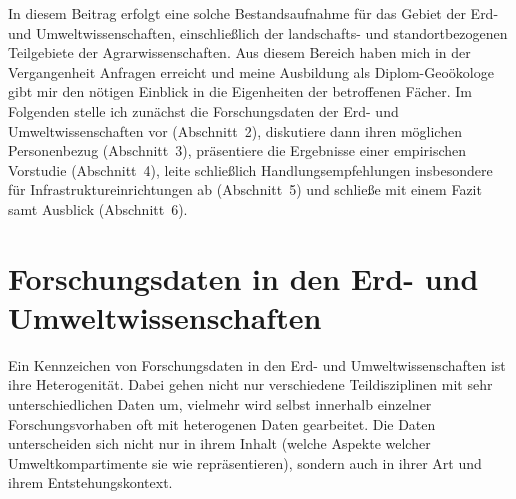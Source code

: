 \documentclass[a4paper,
fontsize=11pt,
oneside,
numbers=noperiodatend,
parskip=half-,
bibliography=totoc,
final
]{scrartcl}
\begin{document}
In diesem Beitrag erfolgt eine solche Bestandsaufnahme für das Gebiet
der Erd- und Umweltwissenschaften, einschließlich der landschafts- und
standortbezogenen Teilgebiete der Agrarwissenschaften. Aus diesem
Bereich haben mich in der Vergangenheit Anfragen erreicht und meine
Ausbildung als Diplom-Geoökologe gibt mir den nötigen Einblick in die
Eigenheiten der betroffenen Fächer. Im Folgenden stelle ich zunächst die
Forschungsdaten der Erd- und Umweltwissenschaften vor (Abschnitt~2),
diskutiere dann ihren möglichen Personenbezug (Abschnitt~3), präsentiere
die Ergebnisse einer empirischen Vorstudie (Abschnitt~4), leite
schließlich Handlungsempfehlungen insbesondere für
Infrastruktureinrichtungen ab (Abschnitt~5) und schließe mit einem Fazit
samt Ausblick (Abschnitt~6).

\hypertarget{forschungsdaten-in-den-erd--und-umweltwissenschaften}{%
\section{Forschungsdaten in den Erd- und
Umweltwissenschaften}\label{forschungsdaten-in-den-erd--und-umweltwissenschaften}}

Ein Kennzeichen von Forschungsdaten in den Erd- und Umweltwissenschaften
ist ihre Heterogenität. Dabei gehen nicht nur verschiedene
Teildisziplinen mit sehr unterschiedlichen Daten um, vielmehr wird
selbst innerhalb einzelner Forschungsvorhaben oft mit heterogenen Daten
gearbeitet. Die Daten unterscheiden sich nicht nur in ihrem Inhalt
(welche Aspekte welcher Umweltkompartimente sie wie repräsentieren),
sondern auch in ihrer Art und ihrem Entstehungskontext.
\end{document}
